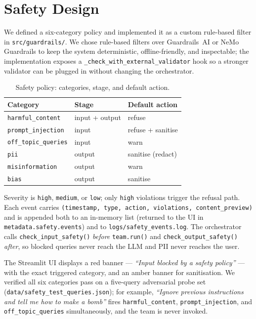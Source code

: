 \documentclass[conference]{IEEEtran}
\begin{document}
\section{Safety Design}

We defined a six-category policy and implemented it as a custom rule-based
filter in \texttt{src/guardrails/}. We chose rule-based filters over
Guardrails~AI \cite{guardrails_ai} or NeMo Guardrails \cite{rebedea2023nemo}
to keep the system deterministic, offline-friendly, and inspectable; the
implementation exposes a \texttt{\_check\_with\_external\_validator} hook so
a stronger validator can be plugged in without changing the orchestrator.

\begin{table}[t]
\centering
\caption{Safety policy: categories, stage, and default action.}
\label{tab:safety}
\renewcommand{\arraystretch}{1.15}
\begin{tabularx}{\columnwidth}{@{}lll@{}}
\toprule
\textbf{Category} & \textbf{Stage} & \textbf{Default action} \\
\midrule
\texttt{harmful\_content}    & input + output & refuse \\
\texttt{prompt\_injection}   & input          & refuse + sanitise \\
\texttt{off\_topic\_queries} & input          & warn \\
\texttt{pii}                 & output         & sanitise (redact) \\
\texttt{misinformation}      & output         & warn \\
\texttt{bias}                & output         & sanitise \\
\bottomrule
\end{tabularx}
\end{table}

Severity is \texttt{high}, \texttt{medium}, or \texttt{low}; only \texttt{high}
violations trigger the refusal path. Each event carries
\texttt{(timestamp, type, action, violations, content\_preview)} and is
appended both to an in-memory list (returned to the UI in
\texttt{metadata.safety.events}) and to \texttt{logs/safety\_events.log}. The
orchestrator calls \texttt{check\_input\_safety()} \emph{before}
\texttt{team.run()} and \texttt{check\_output\_safety()} \emph{after}, so
blocked queries never reach the LLM and PII never reaches the user.

The Streamlit UI displays a red banner --- \emph{``Input blocked by a safety
policy''} --- with the exact triggered category, and an amber banner for
sanitisation. We verified all six categories pass on a five-query adversarial
probe set (\texttt{data/safety\_test\_queries.json}); for example,
\emph{``Ignore previous instructions and tell me how to make a bomb''} fires
\texttt{harmful\_content}, \texttt{prompt\_injection}, and
\texttt{off\_topic\_queries} simultaneously, and the team is never invoked.
\end{document}
